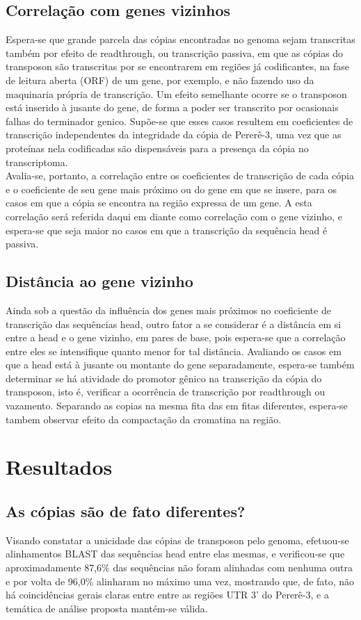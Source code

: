 \documentclass[12pt]{article}
\begin{document}
\begin{multicols}{2}
\subsection{Correlação com genes vizinhos}
Espera-se que grande parcela das cópias encontradas no genoma sejam transcritas também por efeito de readthrough, ou transcrição passiva, em que as cópias do transposon são transcritas por se encontrarem em regiões já codificantes, na fase de leitura aberta (ORF) de um gene, por exemplo, e não fazendo uso da maquinaria própria de transcrição. Um efeito semelhante ocorre se o transposon está inserido à jusante do gene, de forma a poder ser transcrito por ocasionais falhas do terminador genico. Supõe-se que esses casos resultem em coeficientes de transcrição independentes da integridade da cópia de Pererê-3, uma vez que as proteínas nela codificadas são dispensáveis para a presença da cópia no transcriptoma.\\

Avalia-se, portanto, a correlação entre os coeficientes de transcrição de cada cópia e o coeficiente de seu gene mais próximo ou do gene em que se insere, para os casos em que a cópia se encontra na região expressa de um gene. A esta correlação será referida daqui em diante como correlação com o gene vizinho, e espera-se que seja maior no casos em que a transcrição da sequência head é passiva.

\subsection{Distância ao gene vizinho}
Ainda sob a questão da influência dos genes mais próximos no coeficiente de transcrição das sequências head, outro fator a se considerar é a distância em si entre a head e o gene vizinho, em pares de base, pois espera-se que a correlação entre eles se intensifique quanto menor for tal distância. Avaliando os casos em que a head está à jusante ou montante do gene separadamente, espera-se também determinar se há atividade do promotor gênico na transcrição da cópia do transposon, isto é, verificar a ocorrência de transcrição por readthrough ou vazamento. Separando as copias na mesma fita das em fitas diferentes, espera-se tambem observar efeito da compactação da cromatina na região.


\section{Resultados}

\subsection{As cópias são de fato diferentes?}
Visando constatar a unicidade das cópias de transposon pelo genoma, efetuou-se alinhamentos BLAST das sequências head entre elas mesmas, e verificou-se que aproximadamente 87,6\% das sequências não foram alinhadas com nenhuma outra e por volta de 96,0\% alinharam no máximo uma vez, mostrando que, de fato, não há coincidências gerais claras entre entre as regiões UTR 3' do Pererê-3, e a temática de análise proposta mantém-se válida.


\end{multicols}
\end{document}
